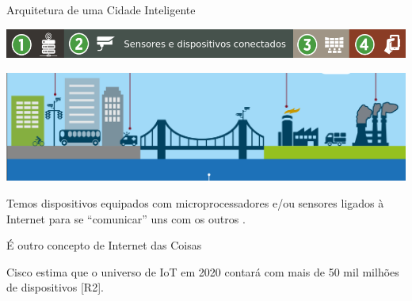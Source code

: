 \documentclass{beamer}
\begin{document}
\begin{frame}{Arquitetura de uma Cidade Inteligente}
\begin{center}
\includegraphics[width=1\textwidth]{img/arquitetura-menu-2.png}  
\end{center}
\begin{center}
\includegraphics[width=.8\textwidth]{img/sensor_2.png}  
\end{center}
\begin{exampleblock}{}
 

Temos dispositivos equipados com microprocessadores e/ou sensores ligados à Internet para se ``comunicar'' uns com os outros .

\begin{flushright}
É outro concepto de Internet das Coisas  
\end{flushright}
\end{exampleblock}



\begin{alertblock}{}
  Cisco estima que o universo de IoT em 2020 contará com mais de 50 mil milhões de dispositivos [R2]. 
\end{alertblock}

\end{frame}
\end{document}
